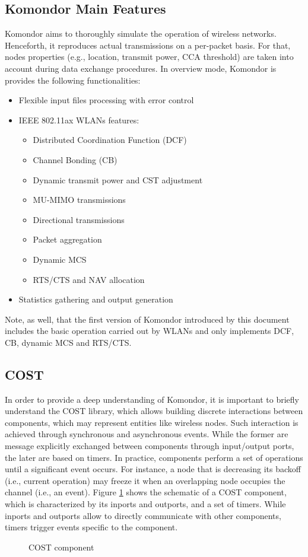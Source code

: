 \documentclass[a4paper]{article}
\begin{document}
	\subsection{Komondor Main Features}
	\label{section:features}
	Komondor aims to thoroughly simulate the operation of wireless networks. Henceforth, it reproduces actual transmissions on a per-packet basis. For that, nodes properties (e.g., location, transmit power, CCA threshold) are taken into account during data exchange procedures. In overview mode, Komondor is provides the following functionalities:
	\begin{itemize}
		\item Flexible input files processing with error control
		\item IEEE 802.11ax WLANs features:
		\begin{itemize}
			\item Distributed Coordination Function (DCF)
			\item Channel Bonding (CB)
			\item Dynamic transmit power and CST adjustment
			\item MU-MIMO transmissions
			\item Directional transmissions
			\item Packet aggregation
			\item Dynamic MCS
			\item RTS/CTS and NAV allocation
		\end{itemize}
		\item Statistics gathering and output generation
	\end{itemize}

	Note, as well, that the first version of Komondor introduced by this document includes the basic operation carried out by WLANs and only implements DCF, CB, dynamic MCS and RTS/CTS.
	
	\subsection{COST}
	\label{section:cost}
	In order to provide a deep understanding of Komondor, it is important to briefly understand the COST library, which allows building discrete interactions between components, which may represent entities like wireless nodes. Such interaction is achieved through synchronous and asynchronous events. While the former are message explicitly exchanged between components through input/output ports, the later are based on timers. In practice, components perform a set of operations until a significant event occurs. For instance, a node that is decreasing its backoff (i.e., current operation) may freeze it when an overlapping node occupies the channel (i.e., an event). Figure \ref{fig:cost} shows the schematic of a COST component, which is characterized by its inports and outports, and a set of timers. While inports and outports allow to directly communicate with other components, timers trigger events specific to the component.
	\begin{figure}[h!]
		\centering
		\caption{COST component}
		\label{fig:cost}
	\end{figure}	
	
\end{document}
